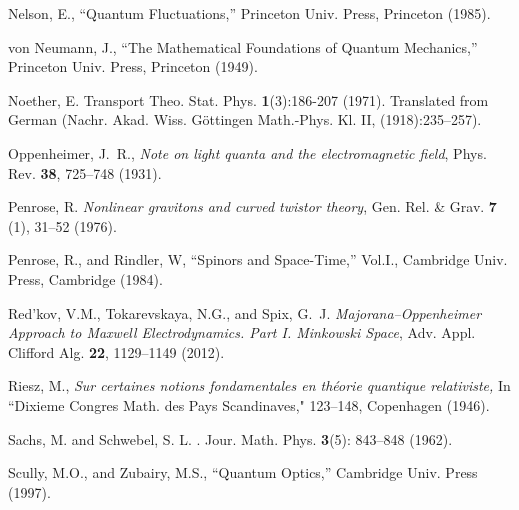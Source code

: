 \documentclass[12pt]{article}
\theoremstyle{definition}
\numberwithin{equation}{section}
\begin{document}
\begin{thebibliography}{[KTZ2020]}
        Nelson, E.,
                ``{Quantum Fluctuations},''
        Princeton Univ. Press, Princeton (1985).\vspace{-4pt}

        von Neumann, J.,
                ``{The Mathematical Foundations of Quantum Mechanics},''
        Princeton Univ. Press, Princeton (1949).\vspace{-4pt}

Noether, E. 
\newblock Transport Theo. Stat. Phys. {\bf 1}(3):186-207 (1971).
\newblock Translated from German  (Nachr. Akad. Wiss. G\"ottingen Math.-Phys. Kl. II, (1918):235--257).\vspace{-4pt}


	Oppenheimer, J.~R.,
	\textit{Note on light quanta and the electromagnetic field},
	Phys. Rev. \textbf{38}, 725--748 (1931).\vspace{-4pt}

Penrose, R.
\textit{Nonlinear gravitons and curved twistor theory},
Gen. Rel. \& Grav. \textbf{7} (1), 31--52 (1976).

  Penrose, R.,
  and
  Rindler, W,
  ``Spinors and Space-Time,'' Vol.I., Cambridge Univ. Press, Cambridge (1984).\vspace{-4pt}
   
  Red'kov, V.M.,
  Tokarevskaya, N.G.,
  and 
  Spix, G.~J. 
   \textit{Majorana--Oppenheimer Approach to Maxwell Electrodynamics. Part I. Minkowski Space},
   Adv. Appl. Clifford Alg. \textbf{22}, 1129--1149 (2012).\vspace{-4pt}

Riesz, M., 
{\it Sur certaines notions fondamentales en th\'eorie quantique relativiste,}
 In ``Dixieme Congres Math. des Pays Scandinaves," 123--148, Copenhagen (1946).%

Sachs, M. and Schwebel, S. L.
.
\newblock Jour. Math. Phys. {\bf 3}(5): 843--848 (1962).\vspace{-4pt}

  Scully, M.O.,
  and 
  Zubairy, M.S., 
  ``Quantum Optics,'' Cambridge Univ. Press (1997). \vspace{-4pt}


\end{thebibliography}
\end{document}
